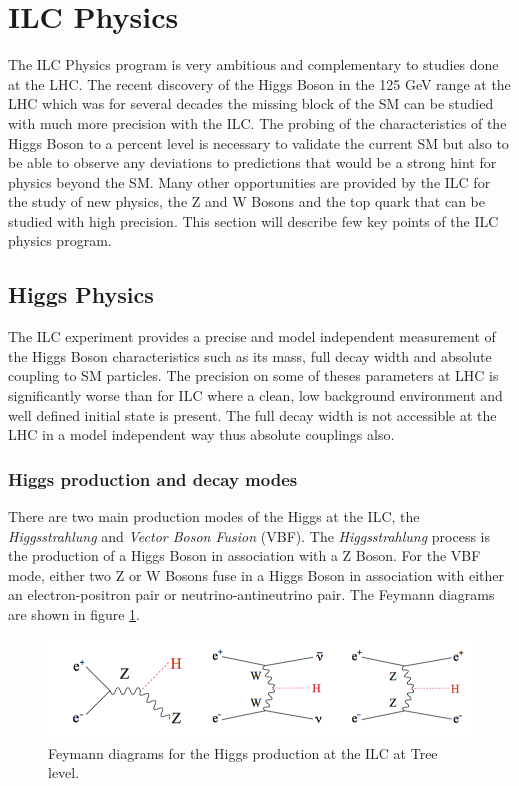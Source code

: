\section{ILC Physics}
\label{sec:ILC_Physics}

The ILC Physics program is very ambitious and complementary to studies done at the LHC. The recent discovery of the Higgs Boson in the 125 GeV range at the LHC which was for several decades the missing block of the SM can be studied with much more precision with the ILC. The probing of the characteristics of the Higgs Boson to a percent level is necessary to validate the current SM but also to be able to observe any deviations to predictions that would be a strong hint for physics beyond the SM. Many other opportunities are provided by the ILC for the study of new physics, the Z and W Bosons and the top quark that can be studied with high precision. This section will describe few key points of the ILC physics program.

\subsection{Higgs Physics}

The ILC experiment provides a precise and model independent measurement of the Higgs Boson characteristics such as its mass, full decay width and absolute coupling to SM particles. The precision on some of theses parameters at LHC is significantly worse than for ILC where a clean, low background environment and well defined initial state is present. The full decay width is not accessible at the LHC in a model independent way thus absolute couplings also.

\subsubsection{Higgs production and decay modes}

There are two main production modes of the Higgs at the ILC, the \textit{Higgsstrahlung} and \textit{Vector Boson Fusion} (VBF). The \textit{Higgsstrahlung} process is the production of a Higgs Boson in association with a Z Boson. For the VBF mode, either two Z or W Bosons fuse in a Higgs Boson in association with either an electron-positron pair or neutrino-antineutrino pair. The Feymann diagrams are shown in figure \ref{fig:HiggsProd}.

\begin{figure}[htbp!]
  \centering
  \includegraphics[width=1\linewidth]{chap2/fig/HiggsProd.png}
  \caption{Feymann diagrams for the Higgs production at the ILC at Tree level. \cite{ILC_TDR_Vol2}} \label{fig:HiggsProd}
\end{figure}

